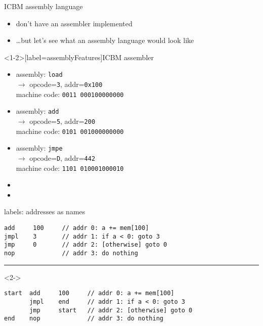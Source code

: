 \begin{frame}{ICBM assembly language}
    \begin{itemize}
    \item don't have an assembler implemented
    \item \ldots but let's see what an assembly language would look like
    \end{itemize}
\end{frame}

\begin{frame}<1-2>[label=assemblyFeatures]{ICBM assembler}
    \begin{itemize}
    \item assembly: {\tt load } \\ $\rightarrow$ opcode={\tt 3}, addr={\tt0x100} \\
        machine code: {\tt 0011 000100000000} \\
    \item assembly: {\tt add } \\ $\rightarrow$ opcode={\tt 5}, addr={\tt 200} \\
        machine code: {\tt 0101 001000000000} \\
    \item assembly: {\tt jmpe } \\ $\rightarrow$ opcode={\tt D}, addr={\tt 442} \\
        machine code: {\tt 1101 010001000010}\\
    \vspace{.5cm}
    \item<2-> 
    \item<2-> 
    \end{itemize}
\end{frame}

\begin{frame}[fragile,label=addrAsName]{labels: addresses as names}
\begin{lstlisting}[language=myasm]
add     100     // addr 0: a += mem[100]
jmpl    3       // addr 1: if a < 0: goto 3
jmp     0       // addr 2: [otherwise] goto 0
nop             // addr 3: do nothing
\end{lstlisting}
\hrule
\begin{visibleenv}<2->
\begin{lstlisting}[language=myasm]
start  add     100     // addr 0: a += mem[100]
       jmpl    end     // addr 1: if a < 0: goto 3
       jmp     start   // addr 2: [otherwise] goto 0
end    nop             // addr 3: do nothing
\end{lstlisting}
\end{visibleenv}
\end{frame}

